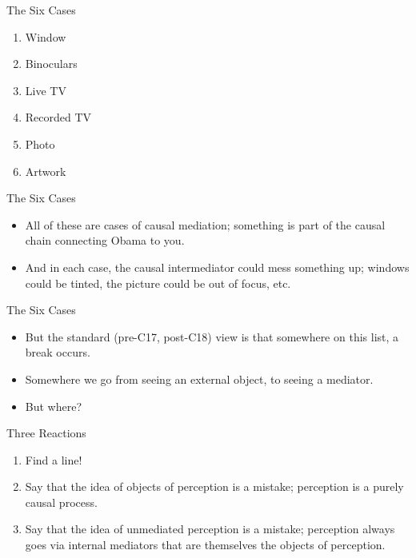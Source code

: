 \documentclass[
  17pt,
  letterpaper,
  ignorenonframetext,
  aspectratio=169,
]{beamer}
\providecommand{\tightlist}{%
  \setlength{\itemsep}{0pt}\setlength{\parskip}{0pt}}\usepackage{longtable,booktabs,array}
\begin{document}
\begin{frame}{The Six Cases}
\protect\hypertarget{the-six-cases}{}
\begin{enumerate}[<+->]
\tightlist
\item
  Window
\item
  Binoculars
\item
  Live TV
\item
  Recorded TV
\item
  Photo
\item
  Artwork
\end{enumerate}
\end{frame}

\begin{frame}{The Six Cases}
\protect\hypertarget{the-six-cases-1}{}
\begin{itemize}[<+->]
\tightlist
\item
  All of these are cases of causal mediation; something is part of the
  causal chain connecting Obama to you.
\item
  And in each case, the causal intermediator could mess something up;
  windows could be tinted, the picture could be out of focus, etc.
\end{itemize}
\end{frame}

\begin{frame}{The Six Cases}
\protect\hypertarget{the-six-cases-2}{}
\begin{itemize}[<+->]
\tightlist
\item
  But the standard (pre-C17, post-C18) view is that somewhere on this
  list, a break occurs.
\item
  Somewhere we go from seeing an external object, to seeing a mediator.
\item
  But where?
\end{itemize}
\end{frame}

\begin{frame}{Three Reactions}
\protect\hypertarget{three-reactions}{}
\begin{enumerate}[<+->]
\tightlist
\item
  Find a line!
\item
  Say that the idea of objects of perception is a mistake; perception is
  a purely causal process.
\item
  Say that the idea of unmediated perception is a mistake; perception
  always goes via internal mediators that are themselves the objects of
  perception.
\end{enumerate}
\end{frame}
\end{document}
